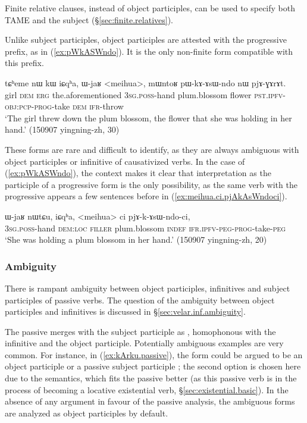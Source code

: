 Finite relative clauses, instead of object participles, can be used to specify both TAME and the subject (§\ref{sec:finite.relatives}).

Unlike subject participles, object participles are attested with the progressive  prefix, as in (\ref{ex:pWkASWndo}). It is the only non-finite form compatible with this prefix.  

\begin{exe}
\ex  \label{ex:pWkASWndo}
\gll  tɕʰeme nɯ kɯ iɕqʰa, ɯ-jaʁ <meihua>, mɯntoʁ pɯ-kɤ-ɤsɯ-ndo nɯ pjɤ-ɣɤrɤt.  \\
girl \textsc{dem} \textsc{erg} the.aforementioned \textsc{3sg}.\textsc{poss}-hand plum.blossom flower \textsc{pst}.\textsc{ipfv}-\textsc{obj}:\textsc{pcp}-\textsc{prog}-take \textsc{dem} \textsc{ifr}-throw \\
\glt `The girl threw down the plum blossom, the flower that she was holding in her hand.' (150907 yingning-zh, 30)
\end{exe}

These forms are rare and difficult to identify, as they are always ambiguous with object participles or infinitive of causativized verbs. In the case of (\ref{ex:pWkASWndo}), the context makes it clear that interpretation as the participle of a progressive form is the only possibility, as the same verb with the progressive appears a few sentences before in (\ref{ex:meihua.ci.pjAkAsWndoci}).

\begin{exe}
\ex  \label{ex:meihua.ci.pjAkAsWndoci}
\gll   ɯ-jaʁ nɯtɕu, iɕqʰa, <meihua> ci pjɤ-k-ɤsɯ-ndo-ci, \\
\textsc{3sg}.\textsc{poss}-hand \textsc{dem}:\textsc{loc} \textsc{filler} plum.blossom \textsc{indef} \textsc{ifr}.\textsc{ipfv}-\textsc{peg}-\textsc{prog}-take-\textsc{peg} \\
 \glt `She was holding a plum blossom in her hand.' (150907 yingning-zh, 20)
\end{exe}

\subsubsection{Ambiguity} \label{sec:object.participle.ambiguity}
There is rampant ambiguity between object participles,  infinitives and subject participles of passive verbs.  The question of the ambiguity between object participles and  infinitives is discussed in §\ref{sec:velar.inf.ambiguity}.

The passive  merges with the subject participle as , homophonous with the infinitive and the object participle. Potentially ambiguous examples are very common. For instance, in (\ref{ex:kArku.passive}), the form  could be argued to be an object participle  or a passive subject participle ; the second option is chosen here due to the semantics, which fits the passive  better (as this passive verb is in the process of becoming a locative existential verb, §\ref{sec:existential.basic}). In the absence of any argument in favour of the passive analysis, the ambiguous  forms are analyzed as object participles by default.

